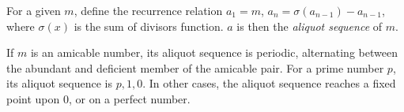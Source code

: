 \documentclass[12pt]{article}
\begin{document}
For a given $m$, define the recurrence relation $a_1 = m$, $a_n = \sigma(a_{n - 1}) - a_{n - 1}$, where $\sigma(x)$ is the sum of divisors function. $a$ is then the {\em aliquot sequence} of $m$.

If $m$ is an amicable number, its aliquot sequence is periodic, alternating between the abundant and deficient member of the amicable pair. For a prime number $p$, its aliquot sequence is $p, 1, 0$. In other cases, the aliquot sequence reaches a fixed point upon 0, or on a perfect number.
\end{document}
